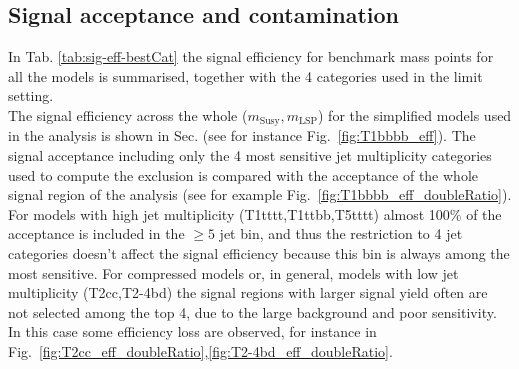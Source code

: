 \subsection{Signal acceptance and contamination}
\label{sec:sig-accept-contam}
In Tab. \ref{tab:sig-eff-bestCat} the signal efficiency for benchmark mass points for all the models is summarised, 
together with the 4 categories used in the limit setting. \\
The signal efficiency across the whole ($m_{\mathrm{Susy}},m_{\mathrm{LSP}}$) for the simplified models used in the analysis 
is shown in Sec. (see for instance Fig.~\ref{fig:T1bbbb_eff}). 
The signal acceptance including only the 4 most sensitive jet multiplicity categories used to compute the exclusion 
is compared with the acceptance of the whole signal region of the analysis (see for example Fig.~\ref{fig:T1bbbb_eff_doubleRatio}). 
For models with high jet multiplicity (T1tttt,T1ttbb,T5tttt) almost 100\% of the acceptance is 
included in the $\geq5$ jet bin, and thus the restriction to 4 jet categories doesn't affect the signal efficiency 
because this bin is always among the most sensitive.  
For compressed models or, in general, models with low jet multiplicity (T2cc,T2-4bd) the signal regions with larger signal yield often are not 
selected among the top 4, due to the large background and poor sensitivity. 
In this case some efficiency loss are observed, for instance in Fig.~\ref{fig:T2cc_eff_doubleRatio},\ref{fig:T2-4bd_eff_doubleRatio}. 


